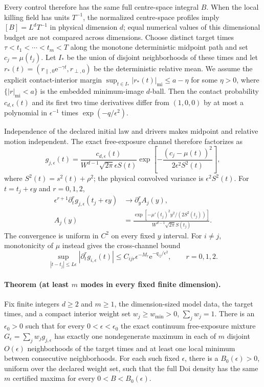 \documentclass[aps,physrev,reprint,amsmath,amssymb,longbibliography,floatfix]{revtex4-2}
\newcommand{\e}{\mathrm e}
\begin{document}
Every control therefore has the same full centre-space integral $B$.
When the local killing field has units $T^{-1}$, the normalized centre-space
profiles imply $[B]=L^dT^{-1}$ in physical dimension $d$; equal numerical
values of this dimensional budget are not compared across dimensions.
Choose distinct target times $\tau<t_1<\cdots<t_m<T$ along the monotone
deterministic midpoint path and set $c_j=\mu(t_j)$.  Let $I_*$ be the union of
disjoint neighborhoods of these times and let
$r_*(t)=(r_{\parallel,0}\e^{-\gamma t},r_{\perp,0})$ be the deterministic
relative mean.  We assume the explicit contact-interior margin
$\sup_{t\in I_*}|r_*(t)|_{\mathrm{mi}}\le a-\eta$ for some $\eta>0$, where
$\{|r|_{\mathrm{mi}}<a\}$ is the embedded minimum-image $d$-ball.  Then the
contact probability $c_{d,\epsilon}(t)$ and its first two time derivatives
differ from $(1,0,0)$ by at most a polynomial in $\epsilon^{-1}$ times
$\exp(-q/\epsilon^2)$.

Independence of the declared initial law and drivers makes midpoint and
relative motion independent.  The exact free-exposure channel therefore
factorizes as
\begin{equation}
 g_{j,\epsilon}(t)=
 \frac{c_{d,\epsilon}(t)}
 {W^{d-1}\sqrt{2\pi}\epsilon S(t)}
 \exp\!\left[-\frac{(c_j-\mu(t))^2}
 {2\epsilon^2S^2(t)}\right],
\label{eq:physicalclock}
\end{equation}
where $S^2(t)=s^2(t)+\rho^2$; the physical convolved variance is
$\epsilon^2S^2(t)$.  For $t=t_j+\epsilon y$ and $r=0,1,2$,
\begin{align}
 \epsilon^{r+1}\partial_t^r g_{j,\epsilon}(t_j+\epsilon y)
 &\longrightarrow \partial_y^r A_j(y),\nonumber\\
 A_j(y)&=\frac{\exp[-\mu'(t_j)^2y^2/(2S^2(t_j))]}
 {W^{d-1}\sqrt{2\pi}S(t_j)}.
\label{eq:ownclocklimit}
\end{align}
The convergence is uniform in $C^2$ on every fixed $y$ interval.  For
$i\ne j$, monotonicity of $\mu$ instead gives the cross-channel bound
\begin{equation}
 \sup_{|t-t_j|\le L\epsilon}
 |\partial_t^r g_{i,\epsilon}(t)|
 \le C_{ijr}\epsilon^{-M_r}\e^{-q_{ij}/\epsilon^2},
 \qquad r=0,1,2.
\label{eq:crossclock}
\end{equation}

\paragraph{Theorem (at least $m$ modes in every fixed finite dimension).}
Fix finite integers $d\ge2$ and $m\ge1$, the dimension-sized model data,
the target times, and a compact interior weight set
$w_j\ge w_{\min}>0$, $\sum_jw_j=1$.  There is an
$\epsilon_0>0$ such that for every $0<\epsilon<\epsilon_0$ the exact
continuum free-exposure mixture
$G_\epsilon=\sum_jw_jg_{j,\epsilon}$ has exactly one nondegenerate maximum
in each of $m$ disjoint $O(\epsilon)$ neighborhoods of the target times and
at least one local minimum between consecutive neighborhoods.  For each such
fixed $\epsilon$, there is a $B_0(\epsilon)>0$, uniform over the declared
weight set, such that the full Doi density has the same $m$ certified maxima
for every $0<B<B_0(\epsilon)$.
\end{document}
